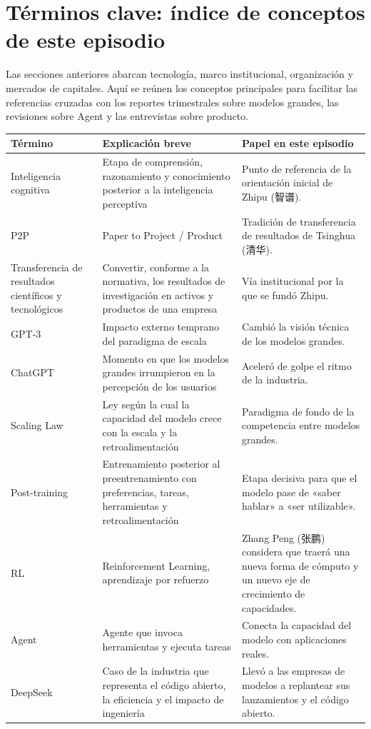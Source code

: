 \section{Términos clave: índice de conceptos de este episodio}

Las secciones anteriores abarcan tecnología, marco institucional, organización y mercados de capitales. Aquí se reúnen los conceptos principales para facilitar las referencias cruzadas con los reportes trimestrales sobre modelos grandes, las revisiones sobre Agent y las entrevistas sobre producto.

\begin{longtable}{p{}p{}p{}}
\toprule
Término & Explicación breve & Papel en este episodio \\
\midrule
Inteligencia cognitiva & Etapa de comprensión, razonamiento y conocimiento posterior a la inteligencia perceptiva & Punto de referencia de la orientación inicial de Zhipu (智谱). \\
P2P & Paper to Project / Product & Tradición de transferencia de resultados de Tsinghua (清华). \\
Transferencia de resultados científicos y tecnológicos & Convertir, conforme a la normativa, los resultados de investigación en activos y productos de una empresa & Vía institucional por la que se fundó Zhipu. \\
GPT-3 & Impacto externo temprano del paradigma de escala & Cambió la visión técnica de los modelos grandes. \\
ChatGPT & Momento en que los modelos grandes irrumpieron en la percepción de los usuarios & Aceleró de golpe el ritmo de la industria. \\
Scaling Law & Ley según la cual la capacidad del modelo crece con la escala y la retroalimentación & Paradigma de fondo de la competencia entre modelos grandes. \\
Post-training & Entrenamiento posterior al preentrenamiento con preferencias, tareas, herramientas y retroalimentación & Etapa decisiva para que el modelo pase de «saber hablar» a «ser utilizable». \\
RL & Reinforcement Learning, aprendizaje por refuerzo & Zhang Peng (张鹏) considera que traerá una nueva forma de cómputo y un nuevo eje de crecimiento de capacidades. \\
Agent & Agente que invoca herramientas y ejecuta tareas & Conecta la capacidad del modelo con aplicaciones reales. \\
DeepSeek & Caso de la industria que representa el código abierto, la eficiencia y el impacto de ingeniería & Llevó a las empresas de modelos a replantear sus lanzamientos y el código abierto. \\

\end{longtable}
